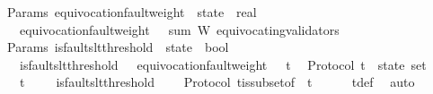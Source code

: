 \begin{isabellebody}
\isanewline
\isanewline
\isanewline
{}\isamarkupfalse%
\ {\isacharparenleft}\ Params{\isacharparenright}\ equivocation{\isacharunderscore}fault{\isacharunderscore}weight\ {\isacharcolon}{\isacharcolon}\ {\isachardoublequoteopen}state\ {\isasymRightarrow}\ real{\isachardoublequoteclose}\isanewline
\ \ \isanewline
\ \ \ \ {\isachardoublequoteopen}equivocation{\isacharunderscore}fault{\isacharunderscore}weight\ {\isasymsigma}\ {\isacharequal}\ sum\ W\ {\isacharparenleft}equivocating{\isacharunderscore}validators\ {\isasymsigma}{\isacharparenright}{\isachardoublequoteclose}\isanewline
\isanewline
\isanewline
{}\isamarkupfalse%
\ {\isacharparenleft}\ Params{\isacharparenright}\ is{\isacharunderscore}faults{\isacharunderscore}lt{\isacharunderscore}threshold\ {\isacharcolon}{\isacharcolon}\ {\isachardoublequoteopen}state\ {\isasymRightarrow}\ bool{\isachardoublequoteclose}\isanewline
\ \ \ \isanewline
\ \ \ \ {\isachardoublequoteopen}is{\isacharunderscore}faults{\isacharunderscore}lt{\isacharunderscore}threshold\ {\isasymsigma}\ {\isacharequal}\ {\isacharparenleft}equivocation{\isacharunderscore}fault{\isacharunderscore}weight\ {\isasymsigma}\ {\isacharless}\ t{\isacharparenright}{\isachardoublequoteclose}\isanewline
\isanewline
{}\isamarkupfalse%
\ {\isacharparenleft}\ Protocol{\isacharparenright}\ {\isasymSigma}t\ {\isacharcolon}{\isacharcolon}\ {\isachardoublequoteopen}state\ set{\isachardoublequoteclose}\isanewline
\ \ \isanewline
\ \ \ \ {\isachardoublequoteopen}{\isasymSigma}t\ {\isacharequal}\ {\isacharbraceleft}{\isasymsigma}\ {\isasymin}\ {\isasymSigma}{\isachardot}\ is{\isacharunderscore}faults{\isacharunderscore}lt{\isacharunderscore}threshold\ {\isasymsigma}{\isacharbraceright}{\isachardoublequoteclose}\ \isanewline
\isanewline
{}\isamarkupfalse%
\ {\isacharparenleft}\ Protocol{\isacharparenright}\ {\isasymSigma}t{\isacharunderscore}is{\isacharunderscore}subset{\isacharunderscore}of{\isacharunderscore}{\isasymSigma}\ {\isacharcolon}\ {\isachardoublequoteopen}{\isasymSigma}t\ {\isasymsubseteq}\ {\isasymSigma}{\isachardoublequoteclose}\isanewline
%
\isadelimproof
\ \ %
\endisadelimproof
%
\isatagproof
{}\isamarkupfalse%
\ {\isasymSigma}t{\isacharunderscore}def\ \isamarkupfalse%
\ auto%
\endisatagproof
{\isafoldproof}%
%
\isadelimproof
\isanewline
%
\endisadelimproof
\isanewline
\isanewline
{}\isamarkupfalse%

\end{isabellebody}
